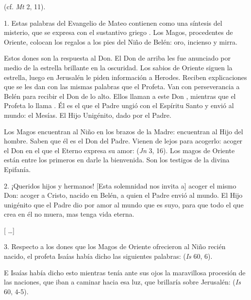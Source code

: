 				\begin{body}
					 (cf. \emph{Mt} 2, 11).
					
					1. Estas palabras del Evangelio de Mateo contienen como una síntesis del misterio, que se expresa con el sustantivo griego . Los Magos, procedentes de Oriente, colocan los regalos a los pies del Niño de Belén: oro, incienso y mirra.
					
					Estos dones son la respuesta al Don. El Don de arriba les fue anunciado por medio de la estrella brillante en la oscuridad. Los sabios de Oriente siguen la estrella, luego en Jerusalén le piden información a Herodes. Reciben explicaciones que se les dan con las mismas palabras que el Profeta. Van con perseverancia a Belén para recibir el Don de lo alto. Ellos llaman a este Don , mientras que el Profeta lo llama . Él es el que el Padre ungió con el Espíritu Santo y envió al mundo: el Mesías. El Hijo Unigénito, dado por el Padre.
					
					Los Magos encuentran al Niño en los brazos de la Madre: encuentran al Hijo del hombre. Saben que él es el Don del Padre. Vienen de lejos para acogerlo: acoger el Don en el que el Eterno expresa su amor:  (\emph{Jn} 3, 16). Los magos de Oriente están entre los primeros en darle la bienvenida. Son los testigos de la divina Epifanía.
					
					2. ¡Queridos hijos y hermanos! {[}Esta solemnidad nos invita a{]} acoger el mismo Don: acoger a Cristo, nacido en Belén, a quien el Padre envió al mundo. El Hijo unigénito que el Padre dio por amor al mundo que es suyo, para que todo el que crea en él no muera, mas tenga vida eterna.
					
					{[} \ldots{}{]}
					
					3. Respecto a los dones que los Magos de Oriente ofrecieron al Niño recién nacido, el profeta Isaías había dicho las siguientes palabras:  (\emph{Is} 60, 6).
					
					E Isaías había dicho esto mientras tenía ante sus ojos la maravillosa procesión de las naciones, que iban a caminar hacia esa luz, que brillaría sobre Jerusalén:  (\emph{Is} 60, 4-5).
					

\end{body}
